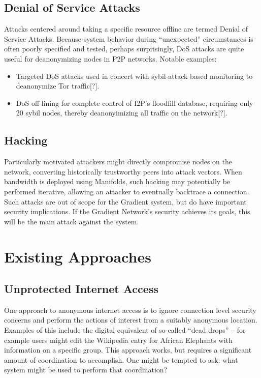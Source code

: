 \documentclass{article}
\begin{document}
\subsection{Denial of Service Attacks}

Attacks centered around taking a specific resource offline are termed Denial of Service Attacks. Because system behavior during “unexpected” circumstances is often poorly specified and tested, perhaps surprisingly, DoS attacks are quite useful for deanonymizing nodes in P2P networks. Notable examples:

\begin{itemize}
    \item Targeted DoS attacks used in concert with sybil-attack based monitoring to deanonymize Tor traffic[?].
    \item DoS off lining for complete control of I2P’s floodfill database, requiring only 20 sybil nodes, thereby deanonyimizing all traffic on the network[?].
\end{itemize}

\subsection{Hacking}

Particularly motivated attackers might directly compromise nodes on the network, converting historically trustworthy peers into attack vectors. When bandwidth is deployed using Manifolds, such hacking may potentially be performed iterative, allowing an attacker to eventually backtrace a connection. Such attacks are out of scope for the Gradient system, but do have important security implications. If the Gradient Network's security achieves its goals, this will be the main attack against the system.

\section{Existing Approaches}

\subsection{Unprotected Internet Access}

One approach to anonymous internet access is to ignore connection level security concerns and perform the actions of interest from a suitably anonymous location. Examples of this include the digital equivalent of so-called “dead drops” – for example users might edit the Wikipedia entry for African Elephants with information on a specific group. This approach works, but requires a significant amount of coordination to accomplish. One might be tempted to ask: what system might be used to perform that coordination?
\end{document}
